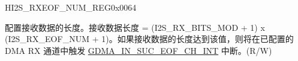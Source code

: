 \begin{register}{H}{I2S\_RXEOF\_NUM\_REG}{0x0064}\label{regdesc:I2SRXEOFNUMREG}
%
%
\regnewline%
\begin{regdesc}\begin{reglist}
\label{fielddesc:I2SRXEOFNUM}\item [I2S\_RX\_EOF\_NUM] 配置接收数据的长度。接收数据长度 = (I2S\_RX\_BITS\_MOD + 1) x (I2S\_RX\_EOF\_NUM + 1)。如果接收数据的长度达到该值，则将在已配置的 DMA RX 通道中触发 \hyperref[int:GDMAINSUCEOFINT]{GDMA\_IN\_SUC\_EOF\_CH\_INT} 中断。(R/W)
\end{reglist}\end{regdesc}
\end{register}


